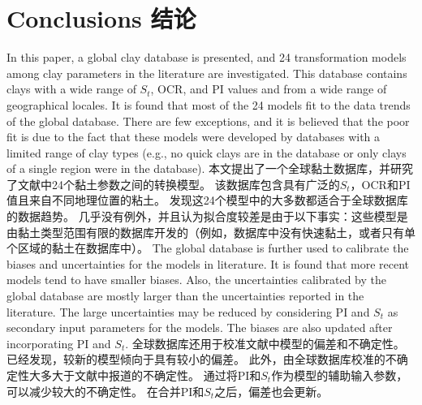 \section{Conclusions 结论}

\begin{Parallel}{0.60\textwidth}{}
    \ParallelLText
    {
        In this paper, a global clay database is presented, and 24 transformation models among clay parameters in the literature are investigated. This database contains clays with a wide range of $S_t$, OCR, and PI values and from a wide range of geographical locales. It is found that most of the 24 models fit to the data trends of the global database. There are few exceptions, and it is believed that the poor fit is due to the fact that these models were developed by databases with a limited range of clay types (e.g., no quick clays are in the database or only clays of a single region were in the database).
    }
    \ParallelRText
    {
        本文提出了一个全球黏土数据库，并研究了文献中24个黏土参数之间的转换模型。 该数据库包含具有广泛的$S_t$，OCR和PI值且来自不同地理位置的粘土。 发现这24个模型中的大多数都适合于全球数据库的数据趋势。 几乎没有例外，并且认为拟合度较差是由于以下事实：这些模型是由黏土类型范围有限的数据库开发的（例如，数据库中没有快速黏土，或者只有单个区域的黏土在数据库中）。
    }
    \ParallelPar
    \ParallelLText
    {
        The global database is further used to calibrate the biases and uncertainties for the models in literature. It is found that more recent models tend to have smaller biases. Also, the uncertainties calibrated by the global database are mostly larger than the uncertainties reported in the literature. The large uncertainties may be reduced by considering PI and $S_t$ as secondary input parameters for the models. The biases are also updated after incorporating PI and $S_t$.
    }
    \ParallelRText
    {
        全球数据库还用于校准文献中模型的偏差和不确定性。 已经发现，较新的模型倾向于具有较小的偏差。 此外，由全球数据库校准的不确定性大多大于文献中报道的不确定性。 通过将PI和$S_t$作为模型的辅助输入参数，可以减少较大的不确定性。 在合并PI和$S_t$之后，偏差也会更新。
    }
\end{Parallel}